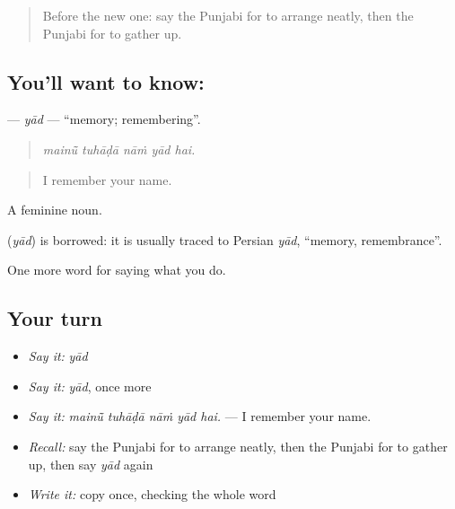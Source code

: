 \label{lesson:PA-C232-yad}



\begin{quote}
Before the new one: say the Punjabi for to arrange neatly, then the Punjabi for to gather up.
\end{quote}

\subsection*{You'll want to know: }
\textbf{} — \emph{yād} — \textquotedblleft{}memory; remembering\textquotedblright{}.

\begin{quote}
    
\end{quote}

\begin{quote}
\emph{mainū̃ tuhāḍā nāṁ yād hai.}
\end{quote}

\begin{quote}
I remember your name.
\end{quote}

A feminine noun.

\begin{cousinweb}
\textbf{} (\emph{yād}) is borrowed: it is usually traced to Persian \emph{yād}, \textquotedblleft{}memory, remembrance\textquotedblright{}.
\end{cousinweb}

\begin{grammarlens}[title={What you've built}]
One more word for saying what you do.
\end{grammarlens}

\subsection*{Your turn}
\begin{itemize}
\raggedright
  \item \emph{Say it:} \emph{yād}
  \item \emph{Say it:} \emph{yād}, once more
  \item \emph{Say it:} \emph{mainū̃ tuhāḍā nāṁ yād hai.} — I remember your name.
  \item \emph{Recall:} say the Punjabi for to arrange neatly, then the Punjabi for to gather up, then say \emph{yād} again
  \item \emph{Write it:} copy \textbf{} once, checking the whole word
\end{itemize}

